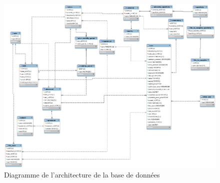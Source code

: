 \newpage
\begin{figure}
	\centering
	\includegraphics[scale=0.35,angle=90]{images/graph.png}
	\caption{Diagramme de l'architecture de la base de données}
\end{figure}
